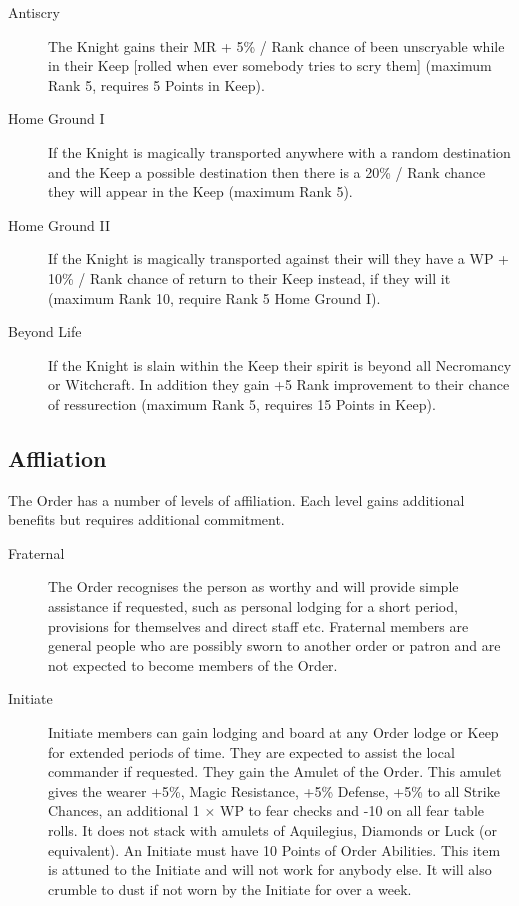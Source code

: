 \documentclass[a4paper]{article}
\begin{document}
\begin{multicols*}{3}
\begin{description}
\item[Antiscry] The Knight gains their MR + 5\% / Rank chance of been
unscryable while in their Keep [rolled when ever somebody tries to
scry them] (maximum Rank 5, requires 5 Points in Keep).

\item[Home Ground I] If the Knight is magically transported anywhere
with a random destination and the Keep a possible destination then
there is a 20\% / Rank chance they will appear in the Keep (maximum
Rank 5).

\item[Home Ground II] If the Knight is magically transported against
their will they have a WP + 10\% / Rank chance of return to their Keep
instead, if they will it (maximum Rank 10, require Rank 5 Home Ground
I).

\item[Beyond Life] If the Knight is slain within the Keep their spirit
is beyond all Necromancy or Witchcraft.  In addition they gain +5\/%
Rank improvement to their chance of ressurection (maximum Rank 5,
requires 15 Points in Keep).

\end{description}

\subsection{Affliation}

The Order has a number of levels of affiliation.  Each level gains
additional benefits but requires additional commitment.

\begin{description}

\item[Fraternal] The Order recognises the person as worthy and will
provide simple assistance if requested, such as personal lodging for a
short period, provisions for themselves and direct staff etc.
Fraternal members are general people who are possibly sworn to another
order or patron and are not expected to become members of the Order.

\item[Initiate] Initiate members can gain lodging and board at any
Order lodge or Keep for extended periods of time.  They are expected
to assist the local commander if requested.  They gain the Amulet of
the Order.  This amulet gives the wearer +5\%, Magic Resistance, +5\%
Defense, +5\% to all Strike Chances, an additional 1 $\times$ WP to
fear checks and -10 on all fear table rolls.  It does not stack with
amulets of Aquilegius, Diamonds or Luck (or equivalent).  An Initiate
must have 10 Points of Order Abilities.  This item is attuned to
the Initiate and will not work for anybody else.  It will also crumble
to dust if not worn by the Initiate for over a week.


\end{description}
\end{multicols*}
\end{document}
